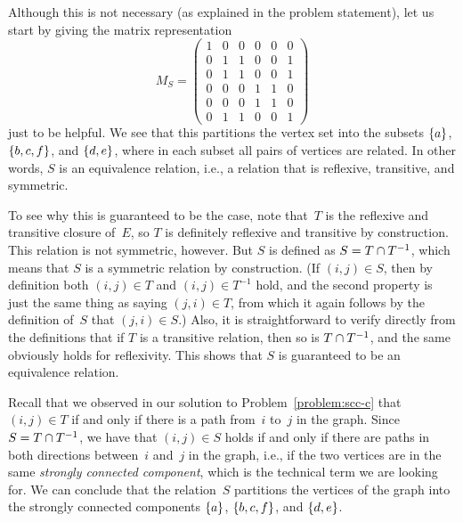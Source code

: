 \documentclass{jn-pset}
\begin{document}
\begin{problem}
\begin{subproblem}
  \end{subproblem}

  \begin{solution}
    Although this is not necessary (as explained in the problem
    statement), let us start by giving the matrix  representation
  \begin{equation}
    \label{eq:adjacency-matrix-transitive-closure}
    M_S =
    \begin{pmatrix}
       1 & 0 & 0 & 0 & 0 & 0 \\
       0 & 1 & 1 & 0 & 0 & 1 \\
       0 & 1 & 1 & 0 & 0 & 1 \\
       0 & 0 & 0 & 1 & 1 & 0 \\
       0 & 0 & 0 & 1 & 1 & 0 \\
       0 & 1 & 1 & 0 & 0 & 1 
    \end{pmatrix}
  \end{equation}
  just to be helpful. We see that this partitions the vertex set into
  the subsets
  $\{ a \}$,
  $\{ b, c, f \}$,
  and
  $\{ d,e \}$,
  where in each subset all pairs of vertices are related. In other
  words, $S$ is an equivalence relation, i.e., a relation that
  is reflexive, transitive, and symmetric.

  To see why this is guaranteed to be the case, note that~$T$ is the
  reflexive and transitive closure of~$E$, so $T$ is definitely
  reflexive and transitive by construction. This relation is not
  symmetric, however.
  But $S$ is defined as
  $S = T \cap T^{-1}$,
  which means that $S$ is a symmetric relation by construction.
  (If
  $(i,j) \in S$,
  then by definition both
  $(i,j) \in T$
  and
  $(i,j) \in T^{-1}$
  hold,
  and the second property is just the same thing as saying
  $(j,i) \in T$,
  from which it again follows by the definition of~$S$ that 
  $(j,i) \in S$.)
  Also, it is straightforward to verify directly from the definitions
  that
  if $T$ is a transitive relation, then so is
  $T \cap T^{-1}$,  
  and the same obviously holds for reflexivity.
  This shows that $S$ is guaranteed to be an equivalence relation.

  Recall that we observed in our solution to
  Problem~\ref{problem:scc-c}
  that
  $(i,j) \in T$
  if and only if there is a path from~$i$ to~$j$ in the graph.
  Since
  $S = T \cap T^{-1}$,
  we have that
  $(i,j) \in S$
  holds
  if and only if there are paths in both directions between~$i$
  and~$j$ in the graph,
  i.e., if the two vertices are in the same
  \emph{strongly connected  component},
  which is the technical term we are looking for.
  We can conclude that
  the relation~$S$  partitions the vertices of the graph into
  the strongly connected components
  $\{ a \}$,
  $\{ b, c, f \}$,
  and
  $\{ d,e \}$.
\end{solution}
  
%   
%   
\end{problem}
\end{document}
